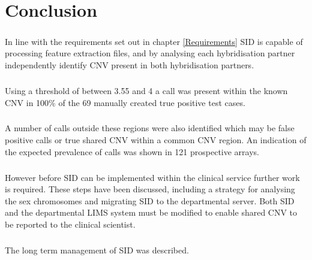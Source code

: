 \chapter{Conclusion}\label{ch:Conclusion} 
\paragraph*{}
In line with the requirements set out in chapter \ref{Requirements} SID is capable of processing feature extraction files, and by analysing each hybridisation partner independently identify CNV present in both hybridisation partners. 
\paragraph*{}
Using a threshold of between 3.55 and 4 a call was present within the known CNV in 100\% of the 69 manually created true positive test cases.
\paragraph*{}
A number of calls outside these regions were also identified which may be false positive calls or true shared CNV within a common CNV region. An indication of the expected prevalence of calls was shown in 121 prospective arrays.
\paragraph*{}
However before SID can be implemented within the clinical service further work is required. These steps have been discussed, including a strategy for analysing the sex chromosomes and migrating SID to the departmental server. Both SID and the departmental LIMS system must be modified to enable shared CNV to be reported to the clinical scientist.
\paragraph*{}
The long term management of SID was described.